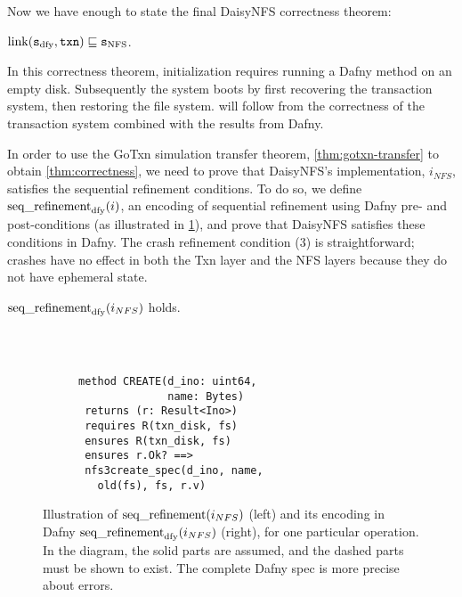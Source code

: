
\resume

Now we have enough to state the final DaisyNFS correctness theorem:
\begin{theorem}
  $\mathrm{link}(\texttt{s}_{\mathrm{dfy}}, \texttt{txn}) \sqsubseteq \texttt{s}_{\mathrm{NFS}}$.%
  \label{thm:correctness}
\end{theorem}
%
In this correctness theorem, initialization requires running a Dafny method on
an empty disk. Subsequently the system boots by first recovering the transaction
system, then restoring the file system.  will follow
from the correctness of the transaction system combined with the results from
Dafny.

In order to use the GoTxn simulation transfer theorem, \cref{thm:gotxn-transfer} to obtain \cref{thm:correctness}, we need to
prove that DaisyNFS's implementation, $i_{NFS}$, satisfies the sequential refinement conditions. To do so, we define
$\operatorname{seq\_refinement}_{\mathrm{dfy}}(i)$, an encoding of sequential refinement
using Dafny pre- and post-conditions (as illustrated in \cref{fig:refinement}), and prove that DaisyNFS
satisfies these conditions in Dafny. The crash refinement condition (3) is
straightforward; crashes have no effect in both the Txn layer and the NFS layers
because they do not have ephemeral state.

\begin{theorem} $\operatorname{seq\_refinement}_{\mathrm{dfy}}(i_{NFS})$ holds.
  \label{thm:dafny}
\end{theorem}

\begin{figure}
  \begin{subfigure}{0.18\textwidth}
    
  \end{subfigure}~~~\vrule~~~~%
\begin{subfigure}{0.2\textwidth}
  {\small
\begin{verbatim}

method CREATE(d_ino: uint64,
              name: Bytes)
 returns (r: Result<Ino>)
 requires R(txn_disk, fs)
 ensures R(txn_disk, fs)
 ensures r.Ok? ==>
 nfs3create_spec(d_ino, name,
   old(fs), fs, r.v)
\end{verbatim}
}
\end{subfigure}
  \caption{Illustration of $\operatorname{seq\_refinement}(i_{NFS})$ (left) and its encoding
in Dafny $\operatorname{seq\_refinement}_{\mathrm{dfy}}(i_{NFS})$ (right), for one particular operation.
In the diagram, the solid parts are assumed, and the
dashed parts must be shown to exist. The complete Dafny spec is more precise about
errors.}
  \label{fig:refinement}
\end{figure}

